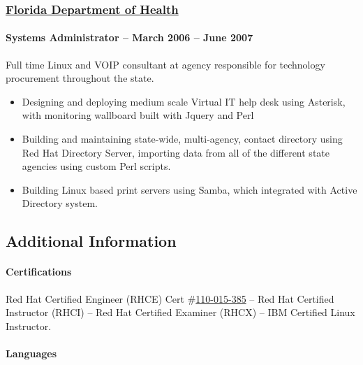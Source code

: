 \documentclass[fontsize=11pt]{scrartcl}
\begin{document}
  \subsubsection{\href{http://www.doh.state.fl.us/}{Florida Department of
      Health}}\label{florida-department-of-health}

  \paragraph{Systems Administrator -- March 2006 -- June
    2007}\label{systems-administrator-march-2006-june-2007}

  Full time Linux and VOIP consultant at agency responsible for technology
  procurement throughout the state.

  \begin{itemize}
    \item
      Designing and deploying medium scale Virtual IT help desk using
      Asterisk, with monitoring wallboard built with Jquery and Perl
    \item
      Building and maintaining state-wide, multi-agency, contact directory
      using Red Hat Directory Server, importing data from all of the
      different state agencies using custom Perl scripts.
    \item
      Building Linux based print servers using Samba, which integrated with
      Active Directory system.
  \end{itemize}

  \subsection{Additional Information}\label{additional-information}

  \paragraph{Certifications}\label{certifications}

  Red Hat Certified Engineer (RHCE) Cert
  \#\href{https://www.redhat.com/wapps/training/certification/verify.html?certNumber=110-015-385\&verify=Verify}{110-015-385}
  -- Red Hat Certified Instructor (RHCI) -- Red Hat Certified Examiner
  (RHCX) -- IBM Certified Linux Instructor.

  \paragraph{Languages}\label{languages}
\end{document}
